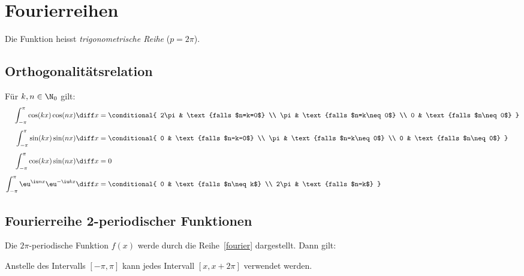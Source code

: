 
\section{Fourierreihen} %
	
	\begin{definition}
		Die Funktion
		heisst \emph{trigonometrische Reihe} ($p=2\pi$).
	\end{definition}
	
	\subsection{Orthogonalitätsrelation} %
		Für $k,n \in \N_0$ gilt:
		\begin{align*}
			\int_{-\pi}^\pi \cos(kx)\cos(nx) \diff x &= \conditional{
				2\pi & \text{falls $n=k=0$} \\
				\pi & \text{falls $n=k\neq0$} \\
				0 & \text{falls $n\neq0$}
			}
			\\[1ex]
			\int_{-\pi}^\pi \sin(kx)\sin(nx) \diff x &= \conditional{
				0 & \text{falls $n=k=0$} \\
				\pi & \text{falls $n=k\neq0$} \\
				0 & \text{falls $n\neq0$}
			}
			\\[1ex]
			\int_{-\pi}^\pi \cos(kx)\sin(nx) \diff x &= 0
			\\[1ex]
			\int_{-\pi}^\pi \eu^{\iu nx}\eu^{-\iu kx} \diff x &= \conditional{
				0 & \text{falls $n\neq k$} \\
				2\pi & \text{falls $n=k$}
			}
		\end{align*}
	\subsection{Fourierreihe 2\latintext{}-periodischer Funktionen} %
		Die $2\pi$-periodische Funktion $f(x)$ werde durch die Reihe~\eqref{fourier}
		dargestellt. Dann gilt:
		
		\begin{bemerkung}
			Anstelle des Intervalls $[-\pi,\pi]$ kann jedes Intervall $[x,x+2\pi]$
			verwendet werden.
		\end{bemerkung}
		
